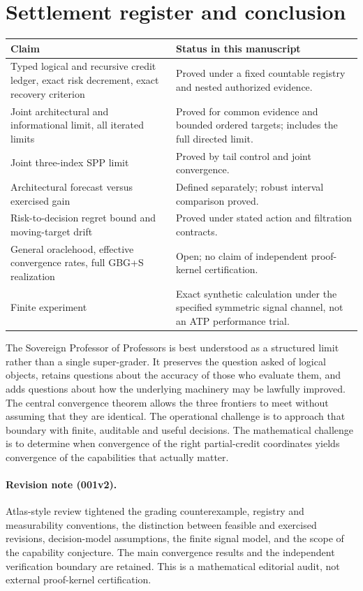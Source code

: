 \documentclass[11pt]{article}
\begin{document}
\section{Settlement register and conclusion}
\small
\begin{tabularx}{\textwidth}{@{}>{\raggedright\arraybackslash}p{}>{\raggedright\arraybackslash}X@{}}
\toprule
Claim & Status in this manuscript\\
\midrule
Typed logical and recursive credit ledger, exact risk decrement, exact recovery criterion & Proved under a fixed countable registry and nested authorized evidence.\\
Joint architectural and informational limit, all iterated limits & Proved for common evidence and bounded ordered targets; includes the full directed limit.\\
Joint three-index SPP limit & Proved by tail control and joint convergence.\\
Architectural forecast versus exercised gain & Defined separately; robust interval comparison proved.\\
Risk-to-decision regret bound and moving-target drift & Proved under stated action and filtration contracts.\\
General oraclehood, effective convergence rates, full GBG+S realization & Open; no claim of independent proof-kernel certification.\\
Finite experiment & Exact synthetic calculation under the specified symmetric signal channel, not an ATP performance trial.\\
\bottomrule
\end{tabularx}
\normalsize

The Sovereign Professor of Professors is best understood as a structured limit rather than a single super-grader. It preserves the question asked of logical objects, retains questions about the accuracy of those who evaluate them, and adds questions about how the underlying machinery may be lawfully improved. The central convergence theorem allows the three frontiers to meet without assuming that they are identical. The operational challenge is to approach that boundary with finite, auditable and useful decisions. The mathematical challenge is to determine when convergence of the right partial-credit coordinates yields convergence of the capabilities that actually matter.

\paragraph{Revision note (001v2).} Atlas-style review tightened the grading counterexample, registry and measurability conventions, the distinction between feasible and exercised revisions, decision-model assumptions, the finite signal model, and the scope of the capability conjecture. The main convergence results and the independent verification boundary are retained. This is a mathematical editorial audit, not external proof-kernel certification.
\end{document}
